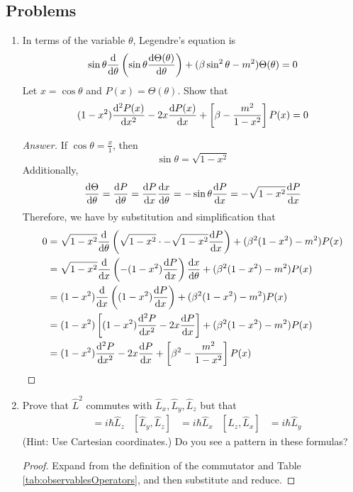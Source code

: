 \documentclass[../notes.tex]{subfiles}
\begin{document}
\subsection*{Problems}
\begin{enumerate}[label={\textbf{6-\arabic*.}},ref={6-\arabic*}]
    \item \label{prb:6-2}In terms of the variable $\theta$, Legendre's equation is
    \begin{equation*}
        \sin\theta\dv{\theta}\left( \sin\theta\dv{\Theta(\theta)}{\theta} \right)+(\beta\sin^2\theta-m^2)\Theta(\theta) = 0
    \end{equation*}
    Let $x=\cos\theta$ and $P(x)=\Theta(\theta)$. Show that
    \begin{equation*}
        (1-x^2)\dv[2]{P(x)}{x}-2x\dv{P(x)}{x}+\left[ \beta-\frac{m^2}{1-x^2} \right]P(x) = 0
    \end{equation*}
    \begin{proof}[Answer]
        If $\cos\theta=\frac{x}{1}$, then
        \begin{equation*}
            \sin\theta = \sqrt{1-x^2}
        \end{equation*}
        Additionally,
        \begin{equation*}
            \dv{\Theta}{\theta} = \dv{P}{\theta}
            = \dv{P}{x}\dv{x}{\theta}
            = -\sin\theta\dv{P}{x}
            = -\sqrt{1-x^2}\dv{P}{x}
        \end{equation*}
        Therefore, we have by substitution and simplification that
        \begin{align*}
            0 &= \sqrt{1-x^2}\dv{\theta}\left( \sqrt{1-x^2}\cdot -\sqrt{1-x^2}\dv{P}{x} \right)+(\beta^2(1-x^2)-m^2)P(x)\\
            &= \sqrt{1-x^2}\dv{x}\left( -(1-x^2)\dv{P}{x} \right)\dv{x}{\theta}+(\beta^2(1-x^2)-m^2)P(x)\\
            &= (1-x^2)\dv{x}\left( (1-x^2)\dv{P}{x} \right)+(\beta^2(1-x^2)-m^2)P(x)\\
            &= (1-x^2)\left[ (1-x^2)\dv[2]{P}{x}-2x\dv{P}{x} \right]+(\beta^2(1-x^2)-m^2)P(x)\\
            &= (1-x^2)\dv[2]{P}{x}-2x\dv{P}{x}+\left[ \beta^2-\frac{m^2}{1-x^2} \right]P(x)
        \end{align*}
    \end{proof}
    \setcounter{enumi}{12}
    \item \label{prb:6-13}Prove that $\hat{L}^2$ commutes with $\hat{L}_x,\hat{L}_y,\hat{L}_z$ but that
    \begin{align*}
        [\hat{L}_x,\hat{L}_y] &= i\hbar\hat{L}_z&
        [\hat{L}_y,\hat{L}_z] &= i\hbar\hat{L}_x&
        [\hat{L}_z,\hat{L}_x] &= i\hbar\hat{L}_y
    \end{align*}
    (Hint: Use Cartesian coordinates.) Do you see a pattern in these formulas?
    \begin{proof}
        Expand from the definition of the commutator and Table \ref{tab:observablesOperators}, and then substitute and reduce.
    \end{proof}
\end{enumerate}
\end{document}
